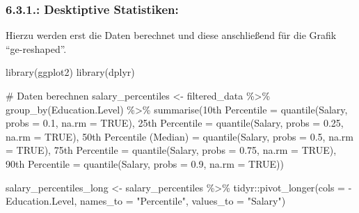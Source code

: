 \documentclass[
  letterpaper,
  DIV=11,
  numbers=noendperiod]{scrartcl}
\newenvironment{Shaded}{\begin{snugshade}}{\end{snugshade}}
\newcommand{\AttributeTok}[1]{\textcolor[rgb]{0.40,0.45,0.13}{#1}}
\newcommand{\CommentTok}[1]{\textcolor[rgb]{0.37,0.37,0.37}{#1}}
\newcommand{\ConstantTok}[1]{\textcolor[rgb]{0.56,0.35,0.01}{#1}}
\newcommand{\FloatTok}[1]{\textcolor[rgb]{0.68,0.00,0.00}{#1}}
\newcommand{\FunctionTok}[1]{\textcolor[rgb]{0.28,0.35,0.67}{#1}}
\newcommand{\NormalTok}[1]{\textcolor[rgb]{0.00,0.23,0.31}{#1}}
\newcommand{\OtherTok}[1]{\textcolor[rgb]{0.00,0.23,0.31}{#1}}
\newcommand{\SpecialCharTok}[1]{\textcolor[rgb]{0.37,0.37,0.37}{#1}}
\newcommand{\StringTok}[1]{\textcolor[rgb]{0.13,0.47,0.30}{#1}}
\begin{document}
\hypertarget{desktiptive-statistiken}{%
\subsubsection{6.3.1.: Desktiptive
Statistiken:}\label{desktiptive-statistiken}}

Hierzu werden erst die Daten berechnet und diese anschließend für die
Grafik ``ge-reshaped''.

\begin{Shaded}
\begin{Highlighting}[]
\FunctionTok{library}\NormalTok{(ggplot2)}
\FunctionTok{library}\NormalTok{(dplyr)}

\CommentTok{\# Daten berechnen}
\NormalTok{salary\_percentiles }\OtherTok{\textless{}{-}}\NormalTok{ filtered\_data }\SpecialCharTok{\%\textgreater{}\%}
  \FunctionTok{group\_by}\NormalTok{(Education.Level) }\SpecialCharTok{\%\textgreater{}\%}
  \FunctionTok{summarise}\NormalTok{(}\StringTok{\textasciigrave{}}\AttributeTok{10th Percentile}\StringTok{\textasciigrave{}} \OtherTok{=} \FunctionTok{quantile}\NormalTok{(Salary, }\AttributeTok{probs =} \FloatTok{0.1}\NormalTok{, }\AttributeTok{na.rm =} \ConstantTok{TRUE}\NormalTok{),}
            \StringTok{\textasciigrave{}}\AttributeTok{25th Percentile}\StringTok{\textasciigrave{}} \OtherTok{=} \FunctionTok{quantile}\NormalTok{(Salary, }\AttributeTok{probs =} \FloatTok{0.25}\NormalTok{, }\AttributeTok{na.rm =} \ConstantTok{TRUE}\NormalTok{),}
            \StringTok{\textasciigrave{}}\AttributeTok{50th Percentile (Median)}\StringTok{\textasciigrave{}} \OtherTok{=} \FunctionTok{quantile}\NormalTok{(Salary, }\AttributeTok{probs =} \FloatTok{0.5}\NormalTok{, }\AttributeTok{na.rm =} \ConstantTok{TRUE}\NormalTok{),}
            \StringTok{\textasciigrave{}}\AttributeTok{75th Percentile}\StringTok{\textasciigrave{}} \OtherTok{=} \FunctionTok{quantile}\NormalTok{(Salary, }\AttributeTok{probs =} \FloatTok{0.75}\NormalTok{, }\AttributeTok{na.rm =} \ConstantTok{TRUE}\NormalTok{),}
            \StringTok{\textasciigrave{}}\AttributeTok{90th Percentile}\StringTok{\textasciigrave{}} \OtherTok{=} \FunctionTok{quantile}\NormalTok{(Salary, }\AttributeTok{probs =} \FloatTok{0.9}\NormalTok{, }\AttributeTok{na.rm =} \ConstantTok{TRUE}\NormalTok{))}

\NormalTok{salary\_percentiles\_long }\OtherTok{\textless{}{-}}\NormalTok{ salary\_percentiles }\SpecialCharTok{\%\textgreater{}\%}
\NormalTok{  tidyr}\SpecialCharTok{::}\FunctionTok{pivot\_longer}\NormalTok{(}\AttributeTok{cols =} \SpecialCharTok{{-}}\NormalTok{Education.Level, }\AttributeTok{names\_to =} \StringTok{"Percentile"}\NormalTok{, }\AttributeTok{values\_to =} \StringTok{"Salary"}\NormalTok{)}


\end{Highlighting}
\end{Shaded}
\end{document}
